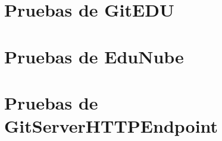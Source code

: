
\chapter{Pruebas de GitEDU}

\label{AnexoF} 

\chapter{Pruebas de EduNube}

\label{AnexoG}

\chapter{Pruebas de GitServerHTTPEndpoint}

\label{AnexoH}

